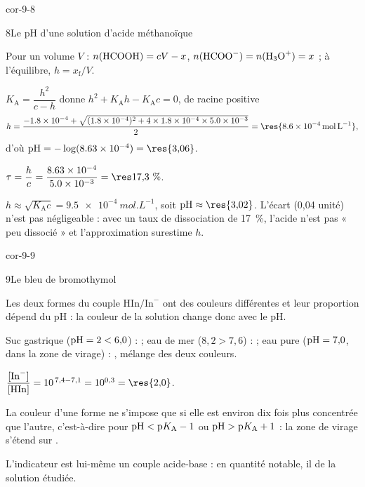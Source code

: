 \begin{blocLivre}{cor-9-8}
\begin{corrige}{8}{Le pH d'une solution d'acide méthanoïque}
\begin{questions}
\item Pour un volume $V$ : $n(\ce{HCOOH})=cV-x$, $n(\ce{HCOO-})=n(\ce{H3O+})=x$ ; à l'équilibre, $h=x_\mathrm{f}/V$.
\item $K_\mathrm{A}=\dfrac{h^2}{c-h}$ donne $h^2+K_\mathrm{A}h-K_\mathrm{A}c=0$, de racine positive
\[h=\frac{-\num{1.8e-4}+\sqrt{(\num{1.8e-4})^2+4\times\num{1.8e-4}\times\num{5.0e-3}}}{2}=\res{\qty{8,6e-4}{mol.L^{-1}}},\]
d'où $\pH=-\log(\num{8.63e-4})=\res{3{,}06}$.
\item $\tau=\dfrac{h}{c}=\dfrac{\num{8.63e-4}}{\num{5.0e-3}}=\res{17{,}3~\%}$.
\item $h\approx\sqrt{K_\mathrm{A}c}=\qty{9,5e-4}{mol.L^{-1}}$, soit $\pH\approx\res{3{,}02}$. L'écart (0,04 unité) n'est
pas négligeable : avec un taux de dissociation de 17~\%, l'acide n'est pas « peu dissocié » et l'approximation
surestime $h$.
\end{questions}
\end{corrige}
\end{blocLivre}
\begin{blocLivre}{cor-9-9}
\begin{corrige}{9}{Le bleu de bromothymol}
\begin{questions}
\item Les deux formes du couple $\mathrm{HIn}/\mathrm{In}^-$ ont des couleurs différentes et leur proportion dépend du
pH : la couleur de la solution change donc avec le pH.
\item Suc gastrique ($\mathrm{pH}=2<6{,}0$) :  ; eau de mer ($8{,}2>7{,}6$) :  ; eau pure
($\mathrm{pH}=7{,}0$, dans la zone de virage) : , mélange des deux couleurs.
\item $\dfrac{[\ce{In-}]}{[\ce{HIn}]}=10^{\,7{,}4-7{,}1}=10^{0{,}3}=\res{2{,}0}$.
\item La couleur d'une forme ne s'impose que si elle est environ dix fois plus concentrée que l'autre, c'est-à-dire
pour $\mathrm{pH}<\mathrm{p}K_{\mathrm{A}}-1$ ou $\mathrm{pH}>\mathrm{p}K_{\mathrm{A}}+1$ : la zone de virage s'étend sur .
\item L'indicateur est lui-même un couple acide-base : en quantité notable, il  de la
solution étudiée.
\end{questions}
\end{corrige}
\end{blocLivre}
